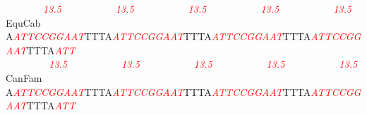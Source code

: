 \documentclass[11pt,twoside,reqno,a4paper]{article}
\begin{document}
{\textcolor{white}{CalJac	}\ \textit{\textcolor{red}{13.5}}\ \ \ \ \ \ \ \ \ \ \ \textit{\textcolor{red}{13.5}}\ \ \ \ \ \ \ \ \ \ \ \textit{\textcolor{red}{13.5}}\ \ \ \ \ \ \ \ \ \ \ \textit{\textcolor{red}{13.5}}\ \ \ \ \ \ \ \ \ \ \ \textit{\textcolor{red}{13.5}}\\
EquCab	A\textit{\textcolor{red}{A}}\textit{\textcolor{red}{T}}\textit{\textcolor{red}{T}}\textit{\textcolor{red}{C}}\textit{\textcolor{red}{C}}\textit{\textcolor{red}{G}}\textit{\textcolor{red}{G}}\textit{\textcolor{red}{A}}\textit{\textcolor{red}{A}}\textit{\textcolor{red}{T}}TTTA\textit{\textcolor{red}{A}}\textit{\textcolor{red}{T}}\textit{\textcolor{red}{T}}\textit{\textcolor{red}{C}}\textit{\textcolor{red}{C}}\textit{\textcolor{red}{G}}\textit{\textcolor{red}{G}}\textit{\textcolor{red}{A}}\textit{\textcolor{red}{A}}\textit{\textcolor{red}{T}}TTTA\textit{\textcolor{red}{A}}\textit{\textcolor{red}{T}}\textit{\textcolor{red}{T}}\textit{\textcolor{red}{C}}\textit{\textcolor{red}{C}}\textit{\textcolor{red}{G}}\textit{\textcolor{red}{G}}\textit{\textcolor{red}{A}}\textit{\textcolor{red}{A}}\textit{\textcolor{red}{T}}TTTA\textit{\textcolor{red}{A}}\textit{\textcolor{red}{T}}\textit{\textcolor{red}{T}}\textit{\textcolor{red}{C}}\textit{\textcolor{red}{C}}\textit{\textcolor{red}{G}}\textit{\textcolor{red}{G}}\textit{\textcolor{red}{A}}\textit{\textcolor{red}{A}}\textit{\textcolor{red}{T}}TTTA\textit{\textcolor{red}{A}}\textit{\textcolor{red}{T}}\textit{\textcolor{red}{T}}\\
\textcolor{white}{EquCab	}\ \textit{\textcolor{red}{13.5}}\ \ \ \ \ \ \ \ \ \ \ \textit{\textcolor{red}{13.5}}\ \ \ \ \ \ \ \ \ \ \ \textit{\textcolor{red}{13.5}}\ \ \ \ \ \ \ \ \ \ \ \textit{\textcolor{red}{13.5}}\ \ \ \ \ \ \ \ \ \ \ \textit{\textcolor{red}{13.5}}\\
CanFam	A\textit{\textcolor{red}{A}}\textit{\textcolor{red}{T}}\textit{\textcolor{red}{T}}\textit{\textcolor{red}{C}}\textit{\textcolor{red}{C}}\textit{\textcolor{red}{G}}\textit{\textcolor{red}{G}}\textit{\textcolor{red}{A}}\textit{\textcolor{red}{A}}\textit{\textcolor{red}{T}}TTTA\textit{\textcolor{red}{A}}\textit{\textcolor{red}{T}}\textit{\textcolor{red}{T}}\textit{\textcolor{red}{C}}\textit{\textcolor{red}{C}}\textit{\textcolor{red}{G}}\textit{\textcolor{red}{G}}\textit{\textcolor{red}{A}}\textit{\textcolor{red}{A}}\textit{\textcolor{red}{T}}TTTA\textit{\textcolor{red}{A}}\textit{\textcolor{red}{T}}\textit{\textcolor{red}{T}}\textit{\textcolor{red}{C}}\textit{\textcolor{red}{C}}\textit{\textcolor{red}{G}}\textit{\textcolor{red}{G}}\textit{\textcolor{red}{A}}\textit{\textcolor{red}{A}}\textit{\textcolor{red}{T}}TTTA\textit{\textcolor{red}{A}}\textit{\textcolor{red}{T}}\textit{\textcolor{red}{T}}\textit{\textcolor{red}{C}}\textit{\textcolor{red}{C}}\textit{\textcolor{red}{G}}\textit{\textcolor{red}{G}}\textit{\textcolor{red}{A}}\textit{\textcolor{red}{A}}\textit{\textcolor{red}{T}}TTTA\textit{\textcolor{red}{A}}\textit{\textcolor{red}{T}}\textit{\textcolor{red}{T}}\\
}
\end{document}
